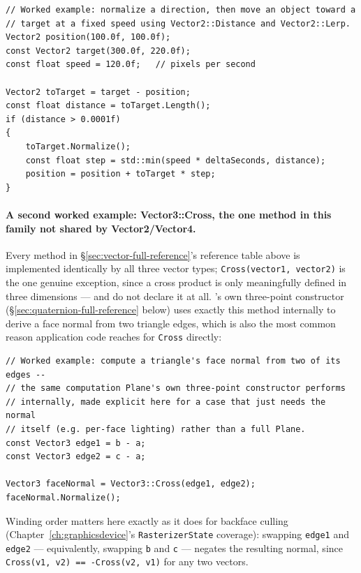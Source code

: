 \begin{lstlisting}
// Worked example: normalize a direction, then move an object toward a
// target at a fixed speed using Vector2::Distance and Vector2::Lerp.
Vector2 position(100.0f, 100.0f);
const Vector2 target(300.0f, 220.0f);
const float speed = 120.0f;   // pixels per second

Vector2 toTarget = target - position;
const float distance = toTarget.Length();
if (distance > 0.0001f)
{
    toTarget.Normalize();
    const float step = std::min(speed * deltaSeconds, distance);
    position = position + toTarget * step;
}
\end{lstlisting}

\paragraph{A second worked example: Vector3::Cross, the one method in this family not shared by Vector2/Vector4.}
Every method in \S\ref{sec:vector-full-reference}'s reference table above is implemented
identically by all three vector types; \texttt{Cross(vector1, vector2)} is the one genuine
exception, since a cross product is only meaningfully defined in three dimensions ---
 and  do not declare it at all. 's own
three-point constructor (\S\ref{sec:quaternion-full-reference} below) uses exactly this method
internally to derive a face normal from two triangle edges, which is also the most common
reason application code reaches for \texttt{Cross} directly:

\begin{lstlisting}
// Worked example: compute a triangle's face normal from two of its edges --
// the same computation Plane's own three-point constructor performs
// internally, made explicit here for a case that just needs the normal
// itself (e.g. per-face lighting) rather than a full Plane.
const Vector3 edge1 = b - a;
const Vector3 edge2 = c - a;

Vector3 faceNormal = Vector3::Cross(edge1, edge2);
faceNormal.Normalize();
\end{lstlisting}

Winding order matters here exactly as it does for backface culling
(Chapter~\ref{ch:graphicsdevice}'s \texttt{RasterizerState} coverage): swapping \texttt{edge1}
and \texttt{edge2} --- equivalently, swapping \texttt{b} and \texttt{c} --- negates the
resulting normal, since \texttt{Cross(v1, v2) == -Cross(v2, v1)} for any two vectors.

